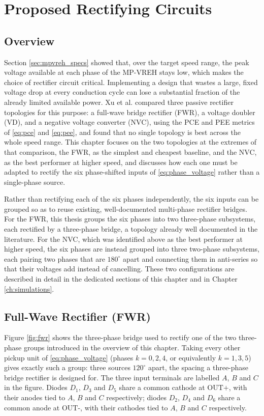 \chapter{Proposed Rectifying Circuits}
\label{ch:topologies}

\section{Overview}

Section \ref{sec:mpvreh_specs} showed that, over the target speed range, the peak voltage available at each phase of the MP-VREH stays low, which makes the choice of rectifier circuit critical. Implementing a design that wastes a large, fixed voltage drop at every conduction cycle can lose a substantial fraction of the already limited available power. Xu et al. \cite{xuSystemImplementationTradeOffs2021} compared three passive rectifier topologies for this purpose: a full-wave bridge rectifier (FWR), a voltage doubler (VD), and a negative voltage converter (NVC), using the PCE and PEE metrics of \eqref{eq:pce} and \eqref{eq:pee}, and found that no single topology is best across the whole speed range. This chapter focuses on the two topologies at the extremes of that comparison, the FWR, as the simplest and cheapest baseline, and the NVC, as the best performer at higher speed, and discusses how each one must be adapted to rectify the six phase-shifted inputs of \eqref{eq:phase_voltage} rather than a single-phase source.

Rather than rectifying each of the six phases independently, the six inputs can be grouped so as to reuse existing, well-documented multi-phase rectifier bridges. For the FWR, this thesis groups the six phases into two three-phase subsystems, each rectified by a three-phase bridge, a topology already well documented in the literature. For the NVC, which was identified above as the best performer at higher speed, the six phases are instead grouped into three two-phase subsystems, each pairing two phases that are $180^\circ$ apart and connecting them in anti-series so that their voltages add instead of cancelling. These two configurations are described in detail in the dedicated sections of this chapter and in Chapter \ref{ch:simulations}.

\section{Full-Wave Rectifier (FWR)}
\label{sec:fwr}

Figure \ref{fig:fwr} shows the three-phase bridge used to rectify one of the two three-phase groups introduced in the overview of this chapter. Taking every other pickup unit of \eqref{eq:phase_voltage} (phases $k=0,2,4$, or equivalently $k=1,3,5$) gives exactly such a group: three sources $120^\circ$ apart, the spacing a three-phase bridge rectifier is designed for. The three input terminals are labelled $A$, $B$ and $C$ in the figure. Diodes $D_1$, $D_3$ and $D_5$ share a common cathode at $\text{OUT+}$, with their anodes tied to $A$, $B$ and $C$ respectively; diodes $D_2$, $D_4$ and $D_6$ share a common anode at $\text{OUT-}$, with their cathodes tied to $A$, $B$ and $C$ respectively.

